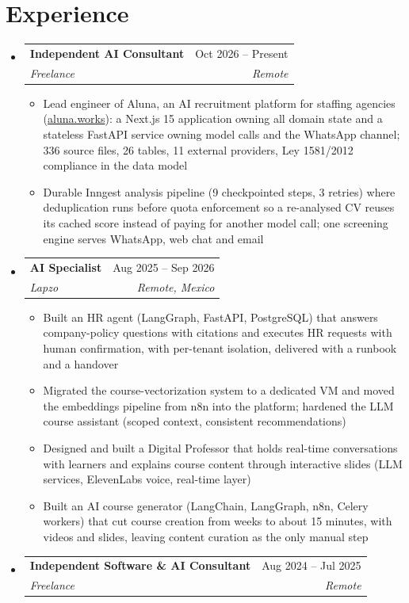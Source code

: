 \documentclass[letterpaper,10pt]{article}
\makeatletter
\newcommand{\resumeSubheading}[4]{
  \vspace{-2pt}
  \item[]
  \begin{tabular*}{\textwidth}{@{\extracolsep{\fill}}l r}
    \textbf{#1} & #2 \\
    \textit{#3} & \textit{#4} \\
  \end{tabular*}
  \vspace{-5pt}
}
\makeatother
\begin{document}
\section{Experience}
\begin{itemize}[leftmargin=0pt, itemindent=0pt, label={}, itemsep=1pt]
\resumeSubheading
{Independent AI Consultant}{Oct 2026 -- Present}
{Freelance}{Remote}
\begin{itemize}[leftmargin=*, itemsep=0pt]
    \item Lead engineer of Aluna, an AI recruitment platform for staffing agencies (\href{https://www.aluna.works}{aluna.works}): a Next.js 15 application owning all domain state and a stateless FastAPI service owning model calls and the WhatsApp channel; 336 source files, 26 tables, 11 external providers, Ley 1581/2012 compliance in the data model
    \item Durable Inngest analysis pipeline (9 checkpointed steps, 3 retries) where deduplication runs before quota enforcement so a re-analysed CV reuses its cached score instead of paying for another model call; one screening engine serves WhatsApp, web chat and email
\end{itemize}
\resumeSubheading
{AI Specialist}{Aug 2025 -- Sep 2026}
{Lapzo}{Remote, Mexico}
\begin{itemize}[leftmargin=*, itemsep=0pt]
    \item Built an HR agent (LangGraph, FastAPI, PostgreSQL) that answers company-policy questions with citations and executes HR requests with human confirmation, with per-tenant isolation, delivered with a runbook and a handover
    \item Migrated the course-vectorization system to a dedicated VM and moved the embeddings pipeline from n8n into the platform; hardened the LLM course assistant (scoped context, consistent recommendations)
    \item Designed and built a Digital Professor that holds real-time conversations with learners and explains course content through interactive slides (LLM services, ElevenLabs voice, real-time layer)
    \item Built an AI course generator (LangChain, LangGraph, n8n, Celery workers) that cut course creation from weeks to about 15 minutes, with videos and slides, leaving content curation as the only manual step
\end{itemize}
\resumeSubheading
{Independent Software \& AI Consultant}{Aug 2024 -- Jul 2025}
{Freelance}{Remote}
\begin{itemize}[leftmargin=*, itemsep=0pt]

\end{itemize}
\end{itemize}
\end{document}
